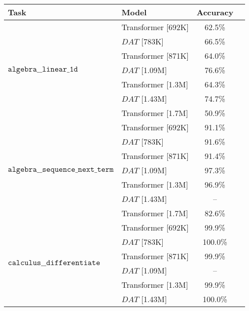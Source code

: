 \begin{tabular}{l|l|cc}
\toprule
Task & Model &  Accuracy \\
\midrule
\multirow{7}{*}{$\texttt{algebra\_\_linear\_1d}$} & Transformer [692K] &                    62.5\% \\
                                 & $DAT$ [783K] &                    66.5\% \\
                                 & Transformer [871K] &                    64.0\% \\
                                 & $DAT$ [1.09M] &                    76.6\% \\
                                 & Transformer [1.3M] &                    64.3\% \\
                                 & $DAT$ [1.43M] &                    74.7\% \\
                                 & Transformer [1.7M] &                    50.9\% \\
\cline{1-3}
\multirow{7}{*}{$\texttt{algebra\_\_sequence\_next\_term}$} & Transformer [692K] &                    91.1\% \\
                                 & $DAT$ [783K] &                    91.6\% \\
                                 & Transformer [871K] &                    91.4\% \\
                                 & $DAT$ [1.09M] &                    97.3\% \\
                                 & Transformer [1.3M] &                    96.9\% \\
                                 & $DAT$ [1.43M] &                        -- \\
                                 & Transformer [1.7M] &                    82.6\% \\
\cline{1-3}
\multirow{7}{*}{$\texttt{calculus\_\_differentiate}$} & Transformer [692K] &                    99.9\% \\
                                 & $DAT$ [783K] &                   100.0\% \\
                                 & Transformer [871K] &                    99.9\% \\
                                 & $DAT$ [1.09M] &                        -- \\
                                 & Transformer [1.3M] &                    99.9\% \\
                                 & $DAT$ [1.43M] &                   100.0\% \\

\end{tabular}
